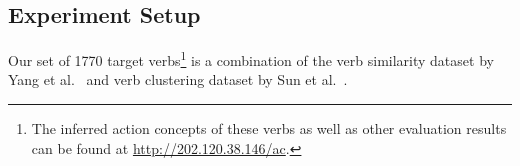 \subsection{Experiment Setup}
\label{sec:preprocess}

Our set of 1770 target verbs\footnote{The inferred action concepts
of these verbs as well as other evaluation results can be found at
\url{http://202.120.38.146/ac}.} is a combination of the verb similarity 
dataset by Yang et al.~ and verb clustering
dataset by Sun et al.~.


